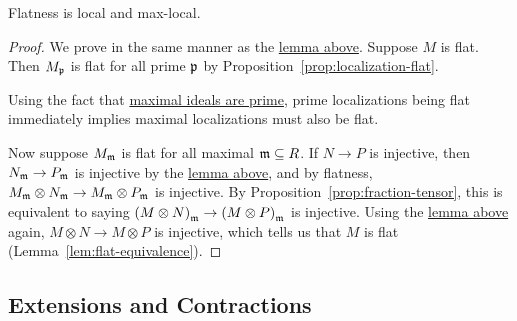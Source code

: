 \begin{theorem}
    Flatness is local and max-local.
\end{theorem}
\begin{proof}
    We prove in the same manner as the \hyperref[lem:local-max-local]{lemma above}.
    Suppose \(M\) is flat.
    Then \(M_{\mathfrak{p}}\) is flat for all prime \(\mathfrak{p}\) by Proposition~\ref{prop:localization-flat}.

    Using the fact that \hyperref[thm:maximal-prime-radical]{maximal ideals are prime},
    prime localizations being flat immediately implies
    maximal localizations must also be flat.

    Now suppose \(M_{\mathfrak{m}}\) is flat for all maximal \(\mathfrak{m} \subseteq R\).
    If \(N \to P\) is injective,
    then \(N_{\mathfrak{m}} \to P_{\mathfrak{m}}\) is injective by the \hyperref[lem:local-max-local]{lemma above},
    and by flatness, \(M_{\mathfrak{m}} \otimes N_{\mathfrak{m}} \to M_{\mathfrak{m}} \otimes P_{\mathfrak{m}}\) is injective.
    By Proposition~\ref{prop:fraction-tensor},
    this is equivalent to saying \({(M \otimes N)}_{\mathfrak{m}} \to {(M \otimes P)}_{\mathfrak{m}}\) is injective.
    Using the \hyperref[lem:local-max-local]{lemma above} again,
    \(M \otimes N \to M \otimes P\) is injective,
    which tells us that \(M\) is flat (Lemma~\ref{lem:flat-equivalence}).
\end{proof}

\subsection*{Extensions and Contractions}

